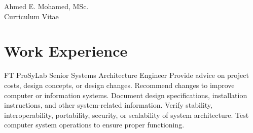 \documentclass[10pt]{article} %
\begin{document}
\begin{paracol}{2} %


\parbox[top][0.12\textheight][c]{\linewidth}{ %
	\vspace{-0.04\textheight} %
	\centering %
	{\sffamily\Huge Ahmed E. Mohamed, MSc.}\\\medskip %
	{\Huge\color{headings}\cvtextfont Curriculum Vitae}
}


\section{Work Experience}







{FT} %
{ProSyLab} %
{Senior Systems Architecture Engineer} %
{
Provide advice on project costs, design concepts, or design changes. Recommend changes to improve computer or information systems. Document design specifications, installation instructions, and other system-related information. Verify stability, interoperability, portability, security, or scalability of system architecture. Test computer system operations to ensure proper functioning.
}%




\end{paracol}
\end{document}
